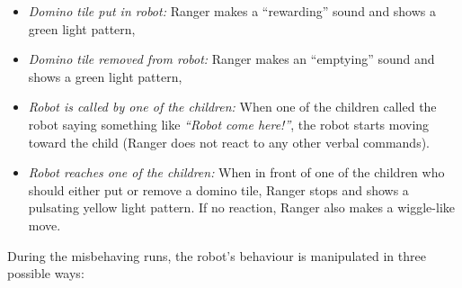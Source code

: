 \documentclass{sig-alternate}
\begin{document}
\begin{itemize}

    \item \emph{Domino tile put in robot:} Ranger makes a ``rewarding'' sound
        and shows a green light pattern,

    \item \emph{Domino tile removed from robot:} Ranger makes an ``emptying''
        sound and shows a green light pattern,

    \item \emph{Robot is called by one of the children:} When one of the
    children called the robot saying something like \textit{``Robot come
    here!''}, the robot starts moving toward the child (Ranger does not react to
    any other verbal commands).

    \item \emph{Robot reaches one of the children:} When in front of one of the
    children who should either put or remove a domino tile, Ranger stops and
    shows a pulsating yellow light pattern. If no reaction, Ranger also makes a
    wiggle-like move.

\end{itemize}

During the misbehaving runs, the robot's behaviour is manipulated in three
possible ways:
\end{document}
